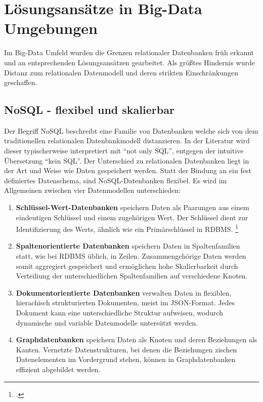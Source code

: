 \section{Lösungsansätze in Big-Data Umgebungen}

Im Big-Data Umfeld wurden die Grenzen relationaler Datenbanken früh erkannt und an entsprechenden Lösungsansätzen gearbeitet. Als größtes Hindernis wurde Distanz zum relationalen Datenmodell und deren strikten Einschränkungen geschaffen.

\subsection{NoSQL - flexibel und skalierbar}

Der Begriff NoSQL beschreibt eine Familie von Datenbanken welche sich von dem traditionellen relationalen Datenbankmodell distanzieren. In der Literatur wird dieser typischerweise interpretiert mit \enquote{not only SQL}, entgegen der intuitive Übersetzung \enquote{kein SQL}. Der Unterschied zu relationalen Datenbanken liegt in der Art und Weise wie Daten gespeichert werden. Statt der Bindung an ein fest definiertes Datenschema, sind NoSQL-Datenbanken flexibel. Es wird im Allgemeinen zwischen vier Datenmodellen unterschieden:

\begin{enumerate}[nosep]
    \item \textbf{Schlüssel-Wert-Datenbanken} speichern Daten als Paarungen aus einem eindeutigen Schlüssel und einem zugehörigen Wert. Der Schlüssel dient zur Identifizierung des Werts, ähnlich wie ein Primärschlüssel in RDBMS. \footcite[S. 2]{wangSQLVsNoSQL2017}
    \item \textbf{Spaltenorientierte Datenbanken} speichern Daten in Spaltenfamilien statt, wie bei RDBMS üblich, in Zeilen. Zusammengehörige Daten werden somit aggregiert gespeichert und ermöglichen hohe Skalierbarkeit durch Verteiliung der unterschiedlichen Spaltenfamilien auf verschiedene Knoten. 
    \item \textbf{Dokumentorientierte Datenbanken} verwalten Daten in flexiblen, hierachisch strukturierten Dokumenten, meist im JSON-Format. Jedes Dokument kann eine unterschiedliche Struktur aufweisen, wodurch dynamische und variable Datenmodelle untersützt werden.
    \item \textbf{Graphdatenbanken} speichern Daten als Knoten und deren Beziehungen als Kanten. Vernetzte Datenstrukturen, bei denen die Beziehungen zischen Datenelementen im Vordergrund stehen, können in Graphdatenbanken effizient abgebildet werden.
\end{enumerate}

